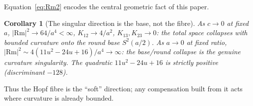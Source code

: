 \documentclass[aps,prd,twocolumn,superscriptaddress,nofootinbib,floatfix]{revtex4-2}
\theoremstyle{plain}
\newtheorem{corollary}{Corollary}
\theoremstyle{definition}
\newcommand{\Rm}{\mathrm{Rm}}
\begin{document}
Equation~\eqref{eq:Rm2} encodes the central geometric fact of this paper.

\begin{corollary}[The singular direction is the base, not the fibre]\label{cor:directions}
As $c\to0$ at fixed $a$, $|\Rm|^2\to 64/a^4<\infty$, $K_{12}\to 4/a^2$, $K_{13},K_{23}\to0$: the total space collapses with \emph{bounded curvature} onto the round base $S^2(a/2)$. As $a\to0$ at fixed ratio, $|\Rm|^2\sim 4(11u^2-24u+16)/a^4\to\infty$: the base/round collapse is the genuine curvature singularity. The quadratic $11u^2-24u+16$ is strictly positive (discriminant $-128$).
\end{corollary}

Thus the Hopf fibre is the ``soft'' direction; any compensation built from it acts where curvature is already bounded.
\end{document}
